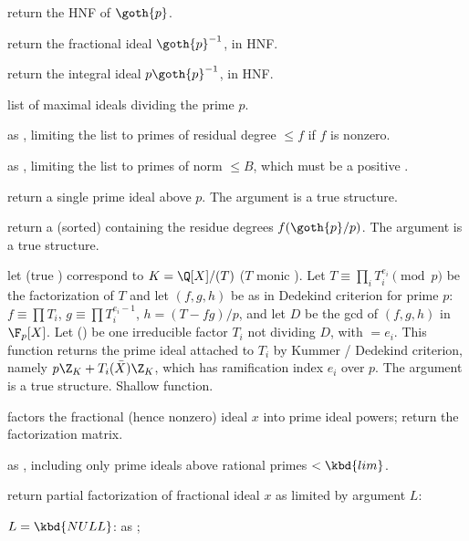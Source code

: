  return the HNF of $\goth{p}$.

 return the fractional ideal $\goth{p}^{-1}$, in HNF.

 return the integral ideal $p \goth{p}^{-1}$, in HNF.

 list of maximal ideals dividing the
prime $p$.

 as ,
limiting the list to primes of residual degree $\leq f$ if $f$ is nonzero.

 as
, limiting the list to primes of norm $\leq B$, which
must be a positive .

 return a single prime ideal
above $p$.
The  argument is a true  structure.

 return a (sorted)
 containing the residue degrees $f(\goth{p} / p)$.
The  argument is a true  structure.

 let 
(true ) correspond to $K = \Q[X]/(T)$ ($T$ monic ).
Let $T \equiv \prod_i T_i^{e_i} \pmod{p}$ be the factorization of $T$ and let
$(f,g,h)$ be as in Dedekind criterion for prime $p$: $f \equiv \prod T_i$,
$g \equiv \prod T_i^{e_i-1}$, $h = (T - fg) / p$, and let $D$ be the gcd
of $(f,g,h)$ in $\F_p[X]$. Let  () be one irreducible factor
$T_i$ not dividing $D$, with  $= e_i$. This function returns the
prime ideal attached to $T_i$ by Kummer / Dedekind criterion, namely
$p \Z_K + T_i(\bar{X}) \Z_K$, which has ramification index $e_i$ over $p$.
The  argument is a true  structure.
Shallow function.

 factors the fractional (hence nonzero)
ideal $x$ into prime ideal powers; return the factorization matrix.

 as ,
including only prime ideals above rational primes $< \kbd{lim}$.

 return partial
factorization of fractional ideal $x$ as limited by argument $L$:

\item $L = \kbd{NULL}$: as ;

